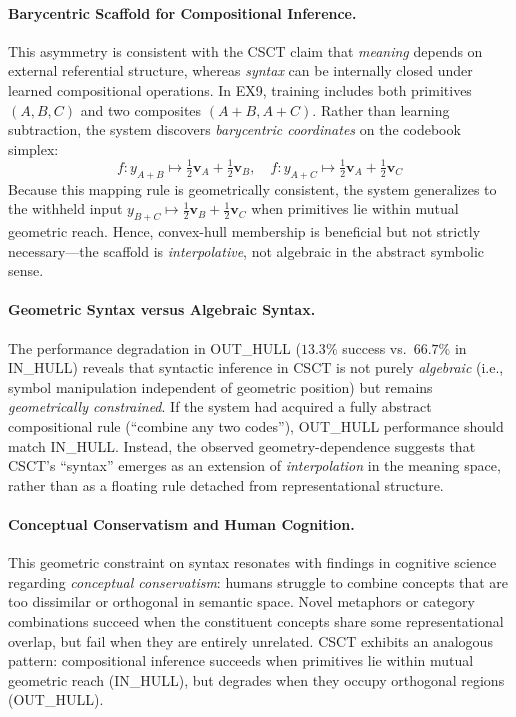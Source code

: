 \documentclass{article}
\begin{document}
\paragraph{Barycentric Scaffold for Compositional Inference.}
This asymmetry is consistent with the CSCT claim that \emph{meaning} depends on external referential structure, whereas \emph{syntax} can be internally closed under learned compositional operations.
In EX9, training includes both primitives $(A, B, C)$ and two composites $(A{+}B, A{+}C)$.
Rather than learning subtraction, the system discovers \emph{barycentric coordinates} on the codebook simplex:
\begin{equation}
    f: y_{A+B} \mapsto \tfrac{1}{2}\mathbf{v}_A + \tfrac{1}{2}\mathbf{v}_B, \quad
    f: y_{A+C} \mapsto \tfrac{1}{2}\mathbf{v}_A + \tfrac{1}{2}\mathbf{v}_C
\end{equation}
Because this mapping rule is geometrically consistent, the system generalizes to the withheld input $y_{B+C} \mapsto \tfrac{1}{2}\mathbf{v}_B + \tfrac{1}{2}\mathbf{v}_C$ when primitives lie within mutual geometric reach.
Hence, convex-hull membership is beneficial but not strictly necessary---the scaffold is \emph{interpolative}, not algebraic in the abstract symbolic sense.

\paragraph{Geometric Syntax versus Algebraic Syntax.}
The performance degradation in OUT\_HULL ($13.3\%$ success vs.\ $66.7\%$ in IN\_HULL) reveals that syntactic inference in CSCT is not purely \emph{algebraic} (i.e., symbol manipulation independent of geometric position) but remains \emph{geometrically constrained}.
If the system had acquired a fully abstract compositional rule (``combine any two codes''), OUT\_HULL performance should match IN\_HULL.
Instead, the observed geometry-dependence suggests that CSCT's ``syntax'' emerges as an extension of \emph{interpolation} in the meaning space, rather than as a floating rule detached from representational structure.

\paragraph{Conceptual Conservatism and Human Cognition.}
This geometric constraint on syntax resonates with findings in cognitive science regarding \emph{conceptual conservatism}: humans struggle to combine concepts that are too dissimilar or orthogonal in semantic space.
Novel metaphors or category combinations succeed when the constituent concepts share some representational overlap, but fail when they are entirely unrelated.
CSCT exhibits an analogous pattern: compositional inference succeeds when primitives lie within mutual geometric reach (IN\_HULL), but degrades when they occupy orthogonal regions (OUT\_HULL).
\end{document}
